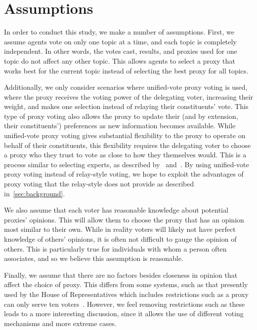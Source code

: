 \section{Assumptions}\label{sec:assumptions}
In order to conduct this study, we make a number of assumptions.
First, we assume agents vote on only one topic at a time, and each topic is completely
independent.
In other words, the votes cast, results, and proxies used for one topic do not affect
any other topic.
This allows agents to select a proxy that works best for the current topic instead of
selecting the best proxy for all topics.

Additionally, we only consider scenarios where unified-vote proxy voting is used, where
the proxy receives the voting power of the delegating voter, increasing their weight,
and makes one selection instead of relaying their constituents' vote.
This type of proxy voting also allows the proxy to update their (and by extension, their
constituents') preferences as new information becomes available.
While unified-vote proxy voting gives substantial flexibility to the proxy to operate
on behalf of their constituents, this flexibility requires the delegating voter to
choose a proxy who they trust to vote as close to how they themselves would.
This is a process similar to selecting experts, as described by~\cite{Miller1969}
and~\cite{Mueller1972}.
By using unified-vote proxy voting instead of relay-style voting, we hope to exploit
the advantages of proxy voting that the relay-style does not provide as described
in~\autoref{sec:background}.

We also assume that each voter has reasonable knowledge about potential proxies'
opinions.
This will allow them to choose the proxy that has an opinion most similar to their own.
While in reality voters will likely not have perfect knowledge of others' opinions,
it is often not difficult to gauge the opinion of others.
This is particularly true for individuals with whom a person often associates, and so
we believe this assumption is reasonable.

Finally, we assume that there are no factors besides closeness in opinion that affect
the choice of proxy.
This differs from some systems, such as that presently used by the House of
Representatives which includes restrictions such as a proxy can only serve ten
voters~\cite{CERP2020}.
However, we feel removing restrictions such as these leads to a more interesting
discussion, since it allows the use of different voting mechanisms and more extreme
cases.
